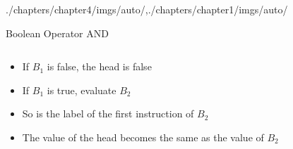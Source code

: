 \begin{graphicspathcontext}{{./chapters/chapter4/imgs/auto/},{./chapters/chapter1/imgs/auto/}}
\begin{bibunit}[apalike]
\begin{frame}{{Boolean Operator} AND}
	\begin{columns}
		\begin{column}{.45\linewidth}
		\end{column}
		\begin{column}{.55\linewidth}
			\begin{footnotesize}
			\begin{sdd}
			\end{sdd}
			\end{footnotesize}
		\end{column}
	\end{columns}
	\vfill
	\begin{itemize}
	\item If $B_1$ is false, the head is false
	\item If $B_1$ is true, evaluate $B_2$
	\item So  is the label of the first instruction of $B_2$
	\item The value of the head becomes the same as the value of $B_2$
	\end{itemize}
\end{frame}


\end{bibunit}
\end{graphicspathcontext}
